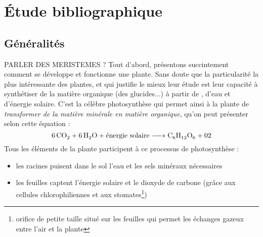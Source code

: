 \section{\'Etude bibliographique}

\subsection{Généralités}
PARLER DES MERISTEMES ?
Tout d'abord, présentons succintement comment se développe et fonctionne une plante. 
Sans doute que la particularité la plus intéressante des plantes, et qui justifie le mieux leur étude est leur capacité à synthétiser de la matière organique (des glucides...) à partir de , d'eau et d'énergie solaire. C'est la célèbre photosynthèse qui permet ainsi à la plante de \textit{transformer de la matière minérale en matière organique}, qu'on peut présenter selon cette équation : 
\[
	\ce{6CO2 + 6H2O + \text{énergie solaire} -> C6H12O6 + 02 }
\]
Tous les éléments de la plante participent à ce processus de photosynthèse :
\begin{itemize}
	\item les racines puisent dans le sol l'eau et les sels minéraux nécessaires		
	\item les feuilles captent l'énergie solaire et le dioxyde de carbone (grâce aux cellules chlorophiliennes et aux stomates\footnote{orifice de petite taille situé sur les feuilles qui permet les échanges gazeux entre l'air et la plante})
\end{itemize}

